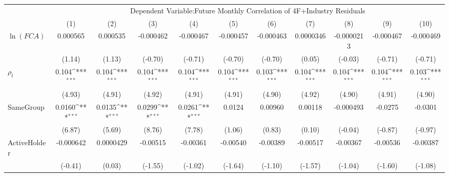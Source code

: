{
\def\sym#1{\ifmmode^{#1}\else\(^{#1}\)\fi}
\begin{tabular}{l*{10}{c}}
\hline\hline
                &\multicolumn{10}{c}{Dependent Variable:Future Monthly Correlation of 4F+Industry Residuals}                                                                                                  \\\cmidrule(lr){2-11}
                &\multicolumn{1}{c}{(1)}         &\multicolumn{1}{c}{(2)}         &\multicolumn{1}{c}{(3)}         &\multicolumn{1}{c}{(4)}         &\multicolumn{1}{c}{(5)}         &\multicolumn{1}{c}{(6)}         &\multicolumn{1}{c}{(7)}         &\multicolumn{1}{c}{(8)}         &\multicolumn{1}{c}{(9)}         &\multicolumn{1}{c}{(10)}         \\
\hline
$\ln(FCA)$      & 0.000565         & 0.000535         &-0.000462         &-0.000467         &-0.000457         &-0.000463         &0.0000346         &-0.0000213         &-0.000467         &-0.000469         \\
                &   (1.14)         &   (1.13)         &  (-0.70)         &  (-0.71)         &  (-0.70)         &  (-0.70)         &   (0.05)         &  (-0.03)         &  (-0.71)         &  (-0.71)         \\
[1em]
 $ {\rho_t} $   &    0.104\sym{***}&    0.104\sym{***}&    0.104\sym{***}&    0.104\sym{***}&    0.104\sym{***}&    0.103\sym{***}&    0.104\sym{***}&    0.104\sym{***}&    0.104\sym{***}&    0.103\sym{***}\\
                &   (4.93)         &   (4.91)         &   (4.92)         &   (4.91)         &   (4.91)         &   (4.90)         &   (4.92)         &   (4.90)         &   (4.91)         &   (4.90)         \\
[1em]
SameGroup       &   0.0160\sym{***}&   0.0135\sym{***}&   0.0299\sym{***}&   0.0261\sym{***}&   0.0124         &  0.00960         &  0.00118         &-0.000493         &  -0.0275         &  -0.0301         \\
                &   (6.87)         &   (5.69)         &   (8.76)         &   (7.78)         &   (1.06)         &   (0.83)         &   (0.10)         &  (-0.04)         &  (-0.87)         &  (-0.97)         \\
[1em]
ActiveHolder    &-0.000642         &0.0000429         & -0.00515         & -0.00361         & -0.00540         & -0.00389         & -0.00517         & -0.00367         & -0.00536         & -0.00387         \\
                &  (-0.41)         &   (0.03)         &  (-1.55)         &  (-1.02)         &  (-1.64)         &  (-1.10)         &  (-1.57)         &  (-1.04)         &  (-1.60)         &  (-1.08)         \\

\end{tabular}}
